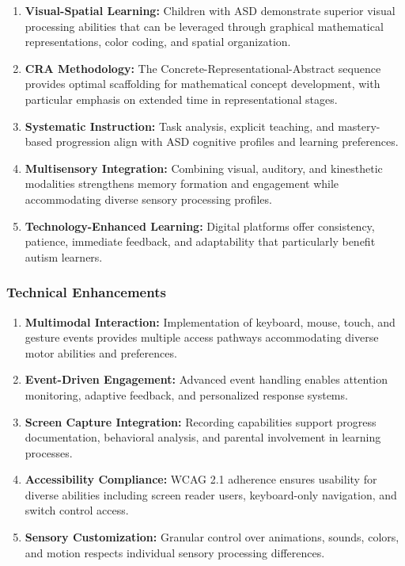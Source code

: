 \documentclass[12pt, a4paper]{article}
\begin{document}
\begin{enumerate}[leftmargin=*]
    \item \textbf{Visual-Spatial Learning:} Children with ASD demonstrate superior visual processing abilities that can be leveraged through graphical mathematical representations, color coding, and spatial organization.
    
    \item \textbf{CRA Methodology:} The Concrete-Representational-Abstract sequence provides optimal scaffolding for mathematical concept development, with particular emphasis on extended time in representational stages.
    
    \item \textbf{Systematic Instruction:} Task analysis, explicit teaching, and mastery-based progression align with ASD cognitive profiles and learning preferences.
    
    \item \textbf{Multisensory Integration:} Combining visual, auditory, and kinesthetic modalities strengthens memory formation and engagement while accommodating diverse sensory processing profiles.
    
    \item \textbf{Technology-Enhanced Learning:} Digital platforms offer consistency, patience, immediate feedback, and adaptability that particularly benefit autism learners.
\end{enumerate}

\subsubsection{Technical Enhancements}

\begin{enumerate}[leftmargin=*]
    \item \textbf{Multimodal Interaction:} Implementation of keyboard, mouse, touch, and gesture events provides multiple access pathways accommodating diverse motor abilities and preferences.
    
    \item \textbf{Event-Driven Engagement:} Advanced event handling enables attention monitoring, adaptive feedback, and personalized response systems.
    
    \item \textbf{Screen Capture Integration:} Recording capabilities support progress documentation, behavioral analysis, and parental involvement in learning processes.
    
    \item \textbf{Accessibility Compliance:} WCAG 2.1 adherence ensures usability for diverse abilities including screen reader users, keyboard-only navigation, and switch control access.
    
    \item \textbf{Sensory Customization:} Granular control over animations, sounds, colors, and motion respects individual sensory processing differences.
\end{enumerate}
\end{document}

